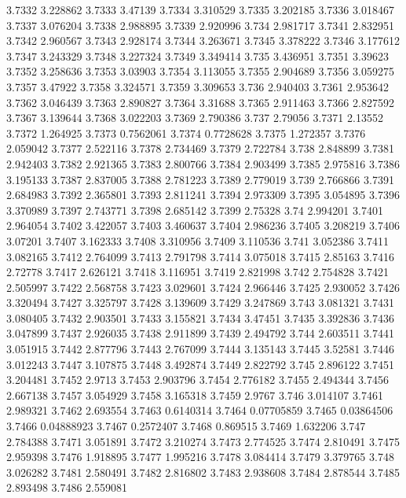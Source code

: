 3.7332  3.228862
3.7333  3.47139
3.7334  3.310529
3.7335  3.202185
3.7336  3.018467
3.7337  3.076204
3.7338  2.988895
3.7339  2.920996
3.734  2.981717
3.7341  2.832951
3.7342  2.960567
3.7343  2.928174
3.7344  3.263671
3.7345  3.378222
3.7346  3.177612
3.7347  3.243329
3.7348  3.227324
3.7349  3.349414
3.735  3.436951
3.7351  3.39623
3.7352  3.258636
3.7353  3.03903
3.7354  3.113055
3.7355  2.904689
3.7356  3.059275
3.7357  3.47922
3.7358  3.324571
3.7359  3.309653
3.736  2.940403
3.7361  2.953642
3.7362  3.046439
3.7363  2.890827
3.7364  3.31688
3.7365  2.911463
3.7366  2.827592
3.7367  3.139644
3.7368  3.022203
3.7369  2.790386
3.737  2.79056
3.7371  2.13552
3.7372  1.264925
3.7373  0.7562061
3.7374  0.7728628
3.7375  1.272357
3.7376  2.059042
3.7377  2.522116
3.7378  2.734469
3.7379  2.722784
3.738  2.848899
3.7381  2.942403
3.7382  2.921365
3.7383  2.800766
3.7384  2.903499
3.7385  2.975816
3.7386  3.195133
3.7387  2.837005
3.7388  2.781223
3.7389  2.779019
3.739  2.766866
3.7391  2.684983
3.7392  2.365801
3.7393  2.811241
3.7394  2.973309
3.7395  3.054895
3.7396  3.370989
3.7397  2.743771
3.7398  2.685142
3.7399  2.75328
3.74  2.994201
3.7401  2.964054
3.7402  3.422057
3.7403  3.460637
3.7404  2.986236
3.7405  3.208219
3.7406  3.07201
3.7407  3.162333
3.7408  3.310956
3.7409  3.110536
3.741  3.052386
3.7411  3.082165
3.7412  2.764099
3.7413  2.791798
3.7414  3.075018
3.7415  2.85163
3.7416  2.72778
3.7417  2.626121
3.7418  3.116951
3.7419  2.821998
3.742  2.754828
3.7421  2.505997
3.7422  2.568758
3.7423  3.029601
3.7424  2.966446
3.7425  2.930052
3.7426  3.320494
3.7427  3.325797
3.7428  3.139609
3.7429  3.247869
3.743  3.081321
3.7431  3.080405
3.7432  2.903501
3.7433  3.155821
3.7434  3.47451
3.7435  3.392836
3.7436  3.047899
3.7437  2.926035
3.7438  2.911899
3.7439  2.494792
3.744  2.603511
3.7441  3.051915
3.7442  2.877796
3.7443  2.767099
3.7444  3.135143
3.7445  3.52581
3.7446  3.012243
3.7447  3.107875
3.7448  3.492874
3.7449  2.822792
3.745  2.896122
3.7451  3.204481
3.7452  2.9713
3.7453  2.903796
3.7454  2.776182
3.7455  2.494344
3.7456  2.667138
3.7457  3.054929
3.7458  3.165318
3.7459  2.9767
3.746  3.014107
3.7461  2.989321
3.7462  2.693554
3.7463  0.6140314
3.7464  0.07705859
3.7465  0.03864506
3.7466  0.04888923
3.7467  0.2572407
3.7468  0.869515
3.7469  1.632206
3.747  2.784388
3.7471  3.051891
3.7472  3.210274
3.7473  2.774525
3.7474  2.810491
3.7475  2.959398
3.7476  1.918895
3.7477  1.995216
3.7478  3.084414
3.7479  3.379765
3.748  3.026282
3.7481  2.580491
3.7482  2.816802
3.7483  2.938608
3.7484  2.878544
3.7485  2.893498
3.7486  2.559081
